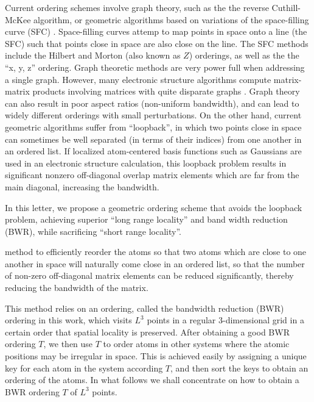 \documentclass[preprint,showpacs,amssymb,aps]{revtex4}
\begin{document}
Current ordering schemes involve graph theory, such as the the reverse Cuthill-McKee 
algorithm\cite{Cuthill_69,Colombo_96v37}, or geometric algorithms based on variations of
the space-filling curve (SFC) \cite{Sagan_94}.  Space-filling curves attemp to map points in space
onto a line (the SFC) such that points close in space are also close on the line.  The SFC methods 
include the Hilbert\cite{Bially_69v15,Challacombe_00v128} and Morton (also known as $Z$) 
orderings\cite{Warren_95v87,Omeltchenko_00v131}, as well as the the ``x, y, z'' ordering\cite{Canning_96v94}.  
Graph theoretic methods are very power full when addressing a single graph.  However, many electronic 
structure algorithms compute matrix-matrix products involving matrices with quite disparate graphs 
\cite{Challacombe,Hutter,Scuseria}.  Graph theory can also result in poor aspect ratios (non-uniform bandwidth), 
and can lead to widely different orderings with small perturbations.  On the other hand, current geometric 
algorithms suffer from ``loopback'', in which  two points close in space can sometimes be well separated 
(in terms of their indices) from one another in an ordered list\cite{Perez_92,Gotsman_96v5}. If localized 
atom-centered basis functions such as Gaussians are used in an electronic structure calculation, this loopback 
problem results in significant nonzero off-diagonal overlap matrix elements which are far from the main diagonal, 
increasing the bandwidth. 

In this letter, we propose a geometric ordering scheme that avoids the loopback problem, achieving superior 
``long range locality'' and band width reduction (BWR), while sacrificing ``short range locality''.  

method to efficiently reorder the atoms so that two atoms which are close to one another in space will naturally come close in an 
ordered list, so that the number of non-zero off-diagonal matrix elements
can be reduced significantly, thereby reducing the bandwidth of the matrix.

This method relies on an ordering, called the bandwidth reduction (BWR)
ordering in this work, which visits $L^3$ points in a regular 3-dimensional
grid in a certain order that spatial locality is preserved.
After obtaining a good BWR ordering $T$,
we then use $T$
to order atoms in other systems 
where the atomic positions may be irregular in space. 
This is achieved easily\cite{Warren_95v87,Pilkington_96v7}
by assigning a unique key for each atom in the system 
according $T$,
and then sort the keys to obtain an ordering of the atoms.
In what follows we shall concentrate 
on how to obtain a BWR ordering $T$ of $L^3$ points.
\end{document}

